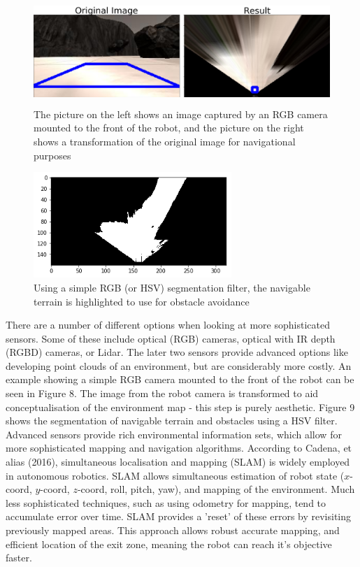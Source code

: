 \documentclass[a4paper]{article}
\begin{document}
\begin{figure}[h]
\centering
\includegraphics[height=4cm]{image4}
\caption{The picture on the left shows an image captured by an RGB camera mounted to the front of the robot, and the picture on the right shows a transformation of the original image for navigational purposes}
\end{figure}

\begin{figure}[h]
\centering
\includegraphics[height=4cm]{image7}
\caption{Using a simple RGB (or HSV) segmentation filter, the navigable terrain is highlighted to use for obstacle avoidance}
\end{figure}

There are a number of different options when looking at more sophisticated sensors. Some of these include optical (RGB) cameras, optical with IR depth (RGBD) cameras, or Lidar. The later two sensors provide advanced options like developing point clouds of an environment, but are considerably more costly. An example showing a simple RGB camera mounted to the front of the robot can be seen in Figure 8. The image from the robot camera is transformed to aid conceptualisation of the environment map - this step is purely aesthetic. Figure 9 shows the segmentation of navigable terrain and obstacles using a HSV filter. Advanced sensors provide rich environmental information sets, which allow for more sophisticated mapping and navigation algorithms. According to Cadena, et alias (2016), simultaneous localisation and mapping (SLAM) is widely employed in autonomous robotics. SLAM allows simultaneous estimation of robot state ($x$-coord, $y$-coord, $z$-coord, roll, pitch, yaw), and mapping of the environment. Much less sophisticated techniques, such as using odometry for mapping, tend to accumulate error over time. SLAM provides a 'reset' of these errors by revisiting previously mapped areas. This approach allows robust accurate mapping, and efficient location of the exit zone, meaning the robot can reach it's objective faster.
\end{document}
